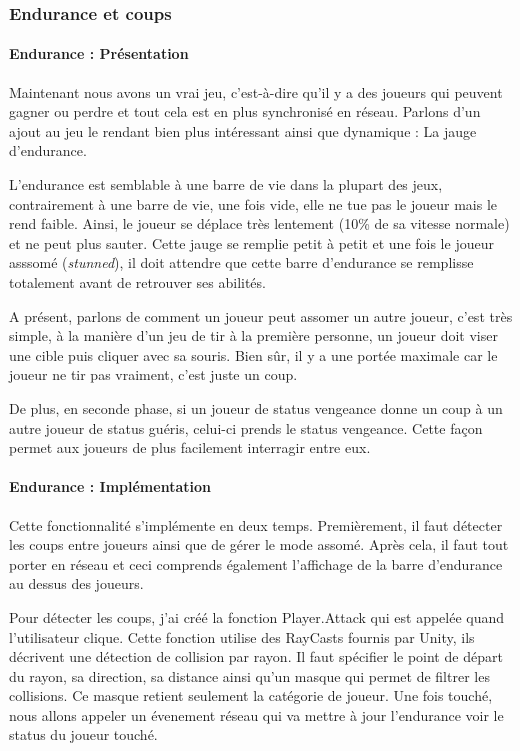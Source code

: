 \documentclass{article}
\begin{document}
\newpage
\subsubsection{Endurance et coups}

\paragraph{Endurance : Présentation}

Maintenant nous avons un vrai jeu, c'est-à-dire qu'il y a des joueurs qui peuvent gagner ou perdre et tout cela est en plus synchronisé en réseau. Parlons d'un ajout au jeu le rendant bien plus intéressant ainsi que dynamique : La jauge d'endurance.

L'endurance est semblable à une barre de vie dans la plupart des jeux, contrairement à une barre de vie, une fois vide, elle ne tue pas le joueur mais le rend faible. Ainsi, le joueur se déplace très lentement (10\% de sa vitesse normale) et ne peut plus sauter. Cette jauge se remplie petit à petit et une fois le joueur asssomé (\emph{stunned}), il doit attendre que cette barre d'endurance se remplisse totalement avant de retrouver ses abilités.

A présent, parlons de comment un joueur peut assomer un autre joueur, c'est très simple, à la manière d'un jeu de tir à la première personne, un joueur doit viser une cible puis cliquer avec sa souris. Bien sûr, il y a une portée maximale car le joueur ne tir pas vraiment, c'est juste un coup.

De plus, en seconde phase, si un joueur de status vengeance donne un coup à un autre joueur de status guéris, celui-ci prends le status vengeance. Cette façon permet aux joueurs de plus facilement interragir entre eux.

\paragraph{Endurance : Implémentation}

Cette fonctionnalité s'implémente en deux temps. Premièrement, il faut détecter les coups entre joueurs ainsi que de gérer le mode assomé. Après cela, il faut tout porter en réseau et ceci comprends également l'affichage de la barre d'endurance au dessus des joueurs.

Pour détecter les coups, j'ai créé la fonction Player.Attack qui est appelée quand l'utilisateur clique. Cette fonction utilise des RayCasts fournis par Unity, ils décrivent une détection de collision par rayon. Il faut spécifier le point de départ du rayon, sa direction, sa distance ainsi qu'un masque qui permet de filtrer les collisions. Ce masque retient seulement la catégorie de joueur.
Une fois touché, nous allons appeler un évenement réseau qui va mettre à jour l'endurance voir le status du joueur touché.
\end{document}
